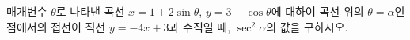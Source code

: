 매개변수 $\theta$로 나타낸 곡선 $x=1+2\sin\theta$, $y=3-\cos\theta$에 대하여 곡선 위의 $\theta=\alpha$인 점에서의 접선이 직선 $y=-4x+3$과 수직일 때, $\sec^2\alpha$의 값을 구하시오.
